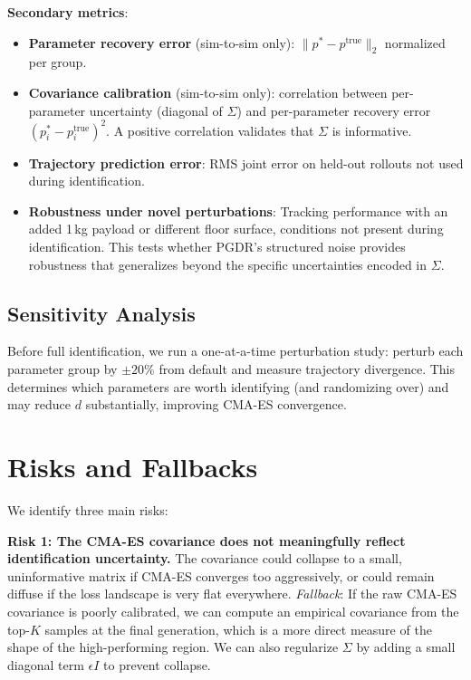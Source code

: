 \documentclass[10pt,twocolumn]{article}
\begin{document}
\textbf{Secondary metrics}:
\begin{itemize}
    \item \textbf{Parameter recovery error} (sim-to-sim only): $\|p^* - p^{\mathrm{true}}\|_2$ normalized per group.
    \item \textbf{Covariance calibration} (sim-to-sim only): correlation between per-parameter uncertainty (diagonal of $\Sigma$) and per-parameter recovery error $(p^*_i - p^{\mathrm{true}}_i)^2$.  A positive correlation validates that $\Sigma$ is informative.
    \item \textbf{Trajectory prediction error}: RMS joint error on held-out rollouts not used during identification.
    \item \textbf{Robustness under novel perturbations}: Tracking performance with an added 1\,kg payload or different floor surface, conditions not present during identification.  This tests whether PGDR's structured noise provides robustness that generalizes beyond the specific uncertainties encoded in $\Sigma$.
\end{itemize}

\subsection{Sensitivity Analysis}

Before full identification, we run a one-at-a-time perturbation study: perturb each parameter group by $\pm 20\%$ from default and measure trajectory divergence.
This determines which parameters are worth identifying (and randomizing over) and may reduce $d$ substantially, improving CMA-ES convergence.

\section{Risks and Fallbacks}

We identify three main risks:

\textbf{Risk 1: The CMA-ES covariance does not meaningfully reflect identification uncertainty.}
The covariance could collapse to a small, uninformative matrix if CMA-ES converges too aggressively, or could remain diffuse if the loss landscape is very flat everywhere.
\emph{Fallback}: If the raw CMA-ES covariance is poorly calibrated, we can compute an empirical covariance from the top-$K$ samples at the final generation, which is a more direct measure of the shape of the high-performing region.
We can also regularize $\Sigma$ by adding a small diagonal term $\epsilon I$ to prevent collapse.
\end{document}
